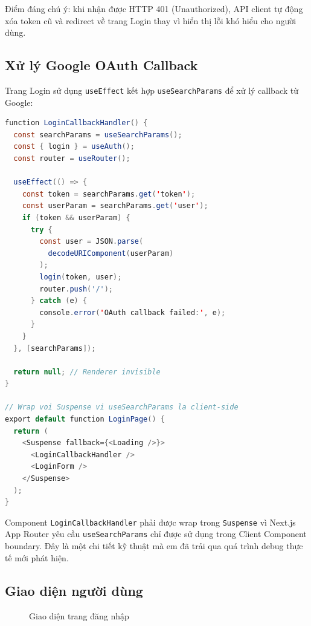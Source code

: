 Điểm đáng chú ý: khi nhận được HTTP 401 (Unauthorized), API client tự động xóa token cũ và redirect về trang Login thay vì hiển thị lỗi khó hiểu cho người dùng.

\subsection{Xử lý Google OAuth Callback}

Trang Login sử dụng \texttt{useEffect} kết hợp \texttt{useSearchParams} để xử lý callback từ Google:

\begin{lstlisting}[caption={Xử lý Google OAuth callback trên Frontend}, label={lst:oauth_callback}, language=Java]
function LoginCallbackHandler() {
  const searchParams = useSearchParams();
  const { login } = useAuth();
  const router = useRouter();

  useEffect(() => {
    const token = searchParams.get('token');
    const userParam = searchParams.get('user');
    if (token && userParam) {
      try {
        const user = JSON.parse(
          decodeURIComponent(userParam)
        );
        login(token, user);
        router.push('/');
      } catch (e) {
        console.error('OAuth callback failed:', e);
      }
    }
  }, [searchParams]);

  return null; // Renderer invisible
}

// Wrap voi Suspense vi useSearchParams la client-side
export default function LoginPage() {
  return (
    <Suspense fallback={<Loading />}>
      <LoginCallbackHandler />
      <LoginForm />
    </Suspense>
  );
}
\end{lstlisting}

Component \texttt{LoginCallbackHandler} phải được wrap trong \texttt{Suspense} vì Next.js App Router yêu cầu \texttt{useSearchParams} chỉ được sử dụng trong Client Component boundary. Đây là một chi tiết kỹ thuật mà em đã trải qua quá trình debug thực tế mới phát hiện.

\subsection{Giao diện người dùng}

\begin{figure}[H]
\centering
{}
\caption{Giao diện trang đăng nhập}
\label{fig:login_page}
\end{figure}

